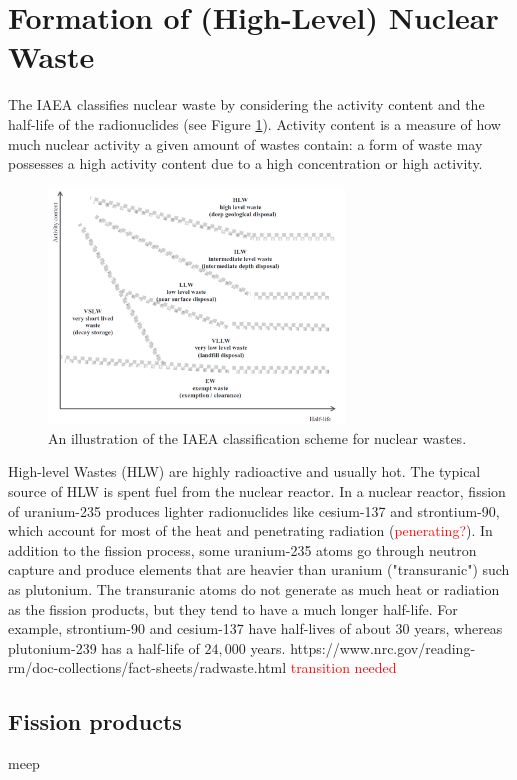 \documentclass[preprint,aip,cha]{revtex4-1}
\newcommand{\red}[1]{\textcolor{red}{#1}}
\begin{document}
\section{Formation of (High-Level) Nuclear Waste}
    The IAEA classifies nuclear waste by considering the activity content and the half-life
    of the radionuclides (see Figure \ref{fig:scheme}). Activity content is a measure of how much nuclear activity
    a given amount of wastes contain: a form of waste may possesses a high activity content due to
    a high concentration or high activity.\cite{iaea09}
    \begin{figure}[H]
        \centering
        \includegraphics[width=0.7\textwidth]{wastescheme.png}
        \caption{An illustration of the IAEA classification scheme for nuclear wastes.\cite{iaea09}}
        \label{fig:scheme}
    \end{figure}

    High-level Wastes (HLW) are highly radioactive and usually
    hot. The typical source of HLW is spent fuel from the nuclear reactor. In a nuclear reactor,
    fission of uranium-235 produces lighter radionuclides like cesium-137 and strontium-90, which
    account for most of the heat and penetrating radiation (\red{penerating?}). In addition to
    the fission process, some uranium-235 atoms go through neutron capture and produce elements that are
    heavier than uranium ("transuranic") such as plutonium. The transuranic atoms do not generate
    as much heat or radiation as the fission products, but they tend to have a much longer half-life.
    For example, strontium-90 and cesium-137 have half-lives of about $30$ years, whereas
    plutonium-239 has a half-life of $24,000$ years. https://www.nrc.gov/reading-rm/doc-collections/fact-sheets/radwaste.html
    \red{transition needed}

    \subsection{Fission products}
    meep
\end{document}
